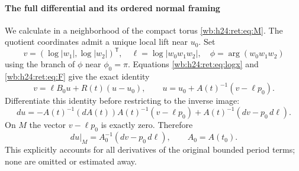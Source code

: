 \paragraph{The full differential and its ordered normal framing}

We calculate in a neighborhood of the compact torus \eqref{wb:h24:ret:eq:M}.
The quotient coordinates admit a unique local lift near \(u_0\).
Set
\[
 v=(\log|w_1|,\log|w_2|)^{\mathsf T},\quad
 \ell=\log|w_0w_1w_2|,\quad
 \phi=\arg(w_0w_1w_2)
\]
using the branch of \(\phi\) near \(\phi_0=\pi\).
Equations \eqref{wb:h24:ret:eq:logx} and \eqref{wb:h24:ret:eq:F} give the exact identity
\begin{equation}
 v=\ell B_0u+R(t)(u-u_0),\qquad
 u=u_0+A(t)^{-1}(v-\ell p_0).
 \label{wb:h24:ret:eq:exact-u}
\end{equation}
Differentiate this identity before restricting to the inverse image:
\begin{equation}
 du=-A(t)^{-1}(dA(t))A(t)^{-1}(v-\ell p_0)
        +A(t)^{-1}(dv-p_0\,d\ell).
 \label{wb:h24:ret:eq:full-derivative}
\end{equation}
On \(M\) the vector \(v-\ell p_0\) is exactly zero.  Therefore
\begin{equation}
 du|_M=A_0^{-1}(dv-p_0\,d\ell),\qquad A_0=A(t_0).
 \label{wb:h24:ret:eq:derivative-on-M}
\end{equation}
This explicitly accounts for all derivatives of the original bounded
period terms; none are omitted or estimated away.

